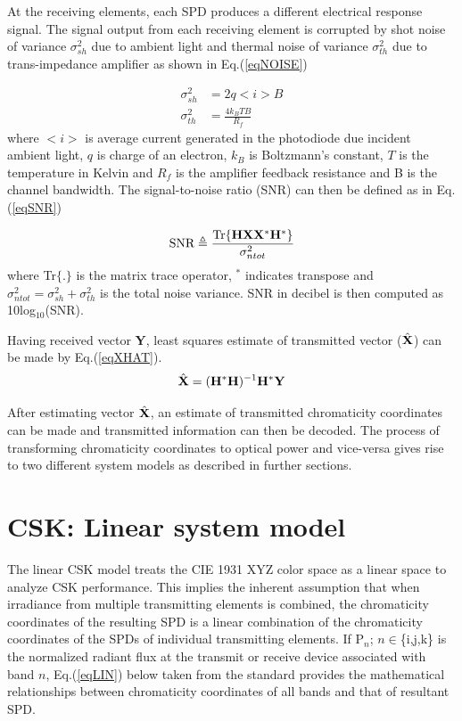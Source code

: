 \documentclass[10pt,letterpaper]{article}
\newcommand{\vm}[1]{{\bf{#1}}}
\begin{document}
At the receiving elements, each SPD produces a different electrical response signal. The signal output from each receiving element is corrupted by shot noise of variance $\sigma^{2}_{sh}$ due to ambient light and thermal noise of variance $\sigma^{2}_{th}$ due to trans-impedance amplifier as shown in Eq.(\ref{eqNOISE})

\begin{equation}
	\begin{aligned}
	\sigma^{2}_{sh} &= 2q<i>B\\
	\sigma^{2}_{th} &= \frac{4k_{B}TB}{R_{f}}
\end{aligned}
\label{eqNOISE}
\end{equation}
where $<i>$ is average current generated in the photodiode due incident ambient light, $q$ is charge of an electron, $k_{B}$ is Boltzmann's constant, $T$ is the temperature in Kelvin and $R_{f}$ is the amplifier feedback resistance and B is the channel bandwidth. The signal-to-noise ratio (SNR) can then be defined as in Eq.(\ref{eqSNR})

\begin{equation}
	\text{SNR} \triangleq \frac{\text{Tr}\{\vm{H}\vm{X}\vm{X}^{*}\vm{H}^{*}\}}{\sigma^{2}_{ntot}}
	\label{eqSNR}
\end{equation}
where Tr$\{.\}$ is the matrix trace operator, $^{*}$ indicates transpose and $\sigma^{2}_{ntot}=\sigma^{2}_{sh}+\sigma^{2}_{th}$ is the total noise variance. SNR in decibel is then computed as 10log$^{ }_{10}$(SNR).

Having received vector \vm{Y}, least squares estimate of transmitted vector ($\hat{\vm{X}}$) can be made by Eq.(\ref{eqXHAT}).
\begin{equation}
	\hat{\vm{X}} = (\vm{H}^{*}\vm{H})^{-1}\vm{H}^{*}\vm{Y}
	\label{eqXHAT}
\end{equation}

After estimating vector $\hat{\vm{X}}$, an estimate of transmitted chromaticity coordinates can be made and transmitted information can then be decoded. The process of transforming chromaticity coordinates to optical power and vice-versa gives rise to two different system models as described in further sections.

\section{CSK: Linear system model}\label{sCSKL}

The linear CSK model treats the CIE 1931 XYZ color space as a linear space to analyze CSK performance. This implies the inherent assumption that when irradiance from multiple transmitting elements is combined, the chromaticity coordinates of the resulting SPD is a linear combination of the chromaticity coordinates of the SPDs of individual transmitting elements. If P$_{n}$; $n\in$\{i,j,k\} is the normalized radiant flux at the transmit or receive device associated with band $n$, Eq.(\ref{eqLIN}) below taken from the standard provides the mathematical relationships between chromaticity coordinates of all bands and that of resultant SPD.
\end{document}
